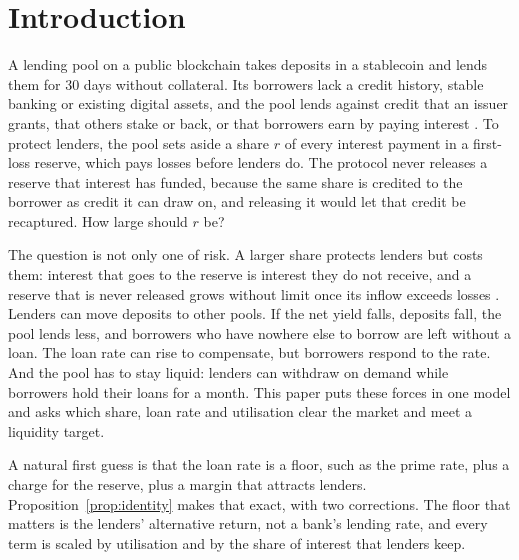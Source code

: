 \documentclass[preprint,11pt,authoryear]{elsarticle}
\theoremstyle{definition}
\begin{document}
\section{Introduction}

A lending pool on a public blockchain takes deposits in a stablecoin and lends them for 30 days
without collateral. Its borrowers lack a credit history, stable banking or existing digital assets,
and the pool lends against credit that an issuer grants, that others stake or back, or that
borrowers earn by paying interest \citep{conservedcredit2026}. To protect lenders, the pool sets
aside a share $r$ of every interest payment in a first-loss reserve, which pays losses before
lenders do. The protocol never releases a reserve that interest has funded, because the same share
is credited to the borrower as credit it can draw on, and releasing it would let that credit be
recaptured. How large should $r$ be?

The question is not only one of risk. A larger share protects lenders but costs them: interest
that goes to the reserve is interest they do not receive, and a reserve that is never released
grows without limit once its inflow exceeds losses \citep{pricingreserve2026}. Lenders can move
deposits to other pools. If the net yield falls, deposits fall, the pool lends less, and borrowers
who have nowhere else to borrow are left without a loan. The loan rate can rise to compensate, but
borrowers respond to the rate. And the pool has to stay liquid: lenders can withdraw on demand while
borrowers hold their loans for a month. This paper puts these forces in one model and asks which
share, loan rate and utilisation clear the market and meet a liquidity target.

A natural first guess is that the loan rate is a floor, such as the prime rate, plus a charge for the
reserve, plus a margin that attracts lenders. Proposition~\ref{prop:identity} makes that exact, with
two corrections. The floor that matters is the lenders' alternative return, not a bank's lending rate,
and every term is scaled by utilisation and by the share of interest that lenders keep.
\end{document}
